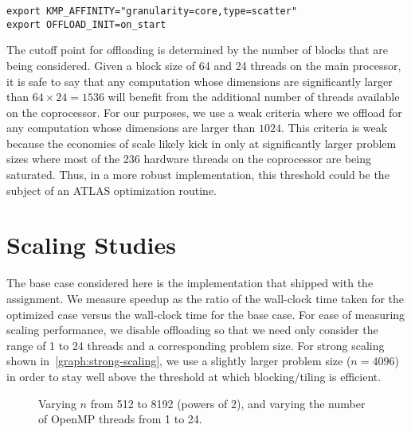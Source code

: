 \documentclass{scrartcl}
\begin{document}
  \begin{lstlisting}
export KMP_AFFINITY="granularity=core,type=scatter"
export OFFLOAD_INIT=on_start
  \end{lstlisting}

  The cutoff point for offloading is determined by the number of blocks that are being considered. Given a block size of 64 and 24 threads on the main processor, it is safe to say that any computation whose dimensions are significantly larger than $64 \times 24 = 1536$ will benefit from the additional number of threads available on the coprocessor. For our purposes, we use a weak criteria where we offload for any computation whose dimensions are larger than $1024$. This criteria is weak because the economies of scale likely kick in only at significantly larger problem sizes where most of the 236 hardware threads on the coprocessor are being saturated. Thus, in a more robust implementation, this threshold could be the subject of an ATLAS optimization routine.
  \section{Scaling Studies}
  The base case considered here is the implementation that shipped with the assignment. We measure speedup as the ratio of the wall-clock time taken for the optimized case versus the wall-clock time for the base case. For ease of measuring scaling performance, we disable offloading so that we need only consider the range of 1 to 24 threads and a corresponding problem size. For strong scaling shown in~\autoref{graph:strong-scaling}, we use a slightly larger problem size ($n = 4096$) in order to stay well above the threshold at which blocking/tiling is efficient.

  \begin{figure}[p]
    \centering
  \caption{Varying $n$ from 512 to 8192 (powers of 2), and varying the number of OpenMP threads from 1 to 24.\label{graph:weak-scaling}}
  \end{figure}
\end{document}
